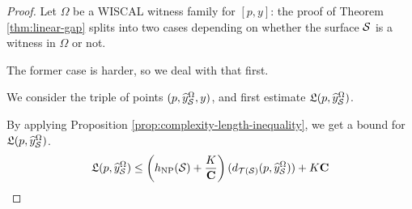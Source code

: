 \documentclass[12pt, reqno]{amsart}
\begin{document}
\begin{proof}


Let $\Omega$ be a WISCAL witness family for $[p, y]$: the proof of Theorem \ref{thm:linear-gap} splits into two cases depending on whether the surface $\mathcal{S}$ is a witness in $\Omega$ or not.

The former case is harder, so we deal with that first.


We consider the triple of points $(p, \widehat{y}_{\mathcal{S}}^{\Omega}, y)$, and first estimate $\mathfrak{L}(p, \widehat{y}_{\mathcal{S}}^{\Omega})$.

By applying Proposition \ref{prop:complexity-length-inequality}, we get a bound for $\mathfrak{L}(p, \widehat{y}_{\mathcal{S}}^{\Omega})$.
\begin{align}
  \label{eq:eq2}
  \mathfrak{L}(p, \widehat{y}_{\mathcal{S}}^{\Omega}) \leq \left( h_{\mathrm{NP}}(\mathcal{S}) + \frac{K}{\mathbf{C}} \right) (d_{\mathcal{T}(\mathcal{S})}(p, \widehat{y}_{\mathcal{S}}^{\Omega})) + K \mathbf{C}
\end{align}


\end{proof}
\end{document}
